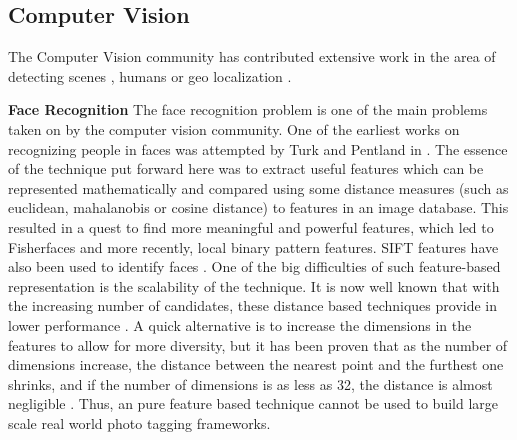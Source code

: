\subsection{Computer Vision}

The Computer Vision community has contributed extensive work in the area of detecting scenes \cite{xiao2010sun}, humans \cite{dalal2005histograms} or geo localization \cite{hays2008im2gps}. 

\textbf{Face Recognition}
The face recognition problem is one of the main problems taken on by the computer vision community. One of the earliest works on recognizing people in faces was attempted by Turk and Pentland in \cite{turk1991eigenfaces}. The essence of the technique put forward here was to extract useful features which can be represented mathematically and compared using some distance measures (such as euclidean, mahalanobis or cosine distance) to features in an image database. This resulted in a quest to find more meaningful and powerful features, which led to Fisherfaces \cite{belhumeur1997eigenfaces} and more recently, local binary pattern \cite{ahonen2006face} features. SIFT features have also been used to identify faces \cite{bicego2006use, geng2009sift, luo2007person}. One of the big difficulties of such feature-based representation is the scalability of the technique. It is now well known that with the increasing number of candidates, these distance based techniques provide in lower performance \cite{wu2004probability}. A quick alternative is to increase the dimensions in the features to allow for more diversity, but it has been proven that as the number of dimensions increase, the distance between the nearest point and the furthest one shrinks, and if the number of dimensions is as less as 32, the distance is almost negligible \cite{beyer1999nearest}. Thus, an pure feature based technique cannot be used to build large scale real world photo tagging frameworks.

